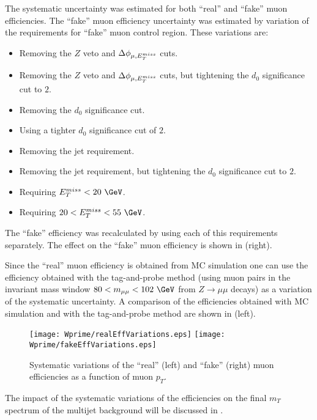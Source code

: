 The systematic uncertainty was estimated for both ``real'' and ``fake'' muon efficiencies.
The ``fake'' muon efficiency uncertainty was estimated by variation of the requirements for ``fake'' muon control region. These variations are:
\begin{itemize}
\item Removing the $Z$ veto and $\Delta\phi_{\mu,E_T^{miss}}$ cuts.
\item Removing the $Z$ veto and $\Delta\phi_{\mu,E_T^{miss}}$ cuts, but tightening the $d_0$ significance cut to $2$.
\item Removing the $d_0$ significance cut. 
\item Using a tighter $d_0$ significance cut of $2$.
\item Removing the jet requirement.
\item Removing the jet requirement, but tightening the $d_0$ significance
cut to $2$.
\item Requiring $\met < 20~\GeV$.
\item Requiring $20 < \met < 55~\GeV$.
\end{itemize}
The ``fake'' efficiency was recalculated by using each of this requirements separately.
The effect on the ``fake'' muon efficiency is shown in  (right).

Since the ``real'' muon efficiency is obtained from MC simulation one can use the efficiency obtained with the tag-and-probe method (using muon pairs in the invariant mass window $80 < m_{\mu\mu} < 102~\GeV$ from $Z\to\mu\mu$ decays) as a variation of the systematic uncertainty. 
A comparison of the efficiencies obtained with MC simulation and with the tag-and-probe method are shown in  (left).

\begin{figure}[]
  \centering
  \texttt{[image: Wprime/realEffVariations.eps]}
  \texttt{[image: Wprime/fakeEffVariations.eps]}
  \caption{Systematic variations of the ``real'' (left) and ``fake'' (right) muon efficiencies as a function of muon $p_T$.}
  \label{fig:matrix_method_systematics}
\end{figure}

The impact of the systematic variations of the efficiencies on the final $m_T$ spectrum of the multijet background will be discussed in .


